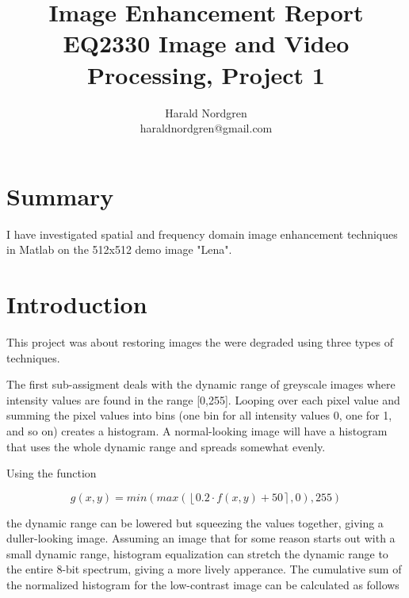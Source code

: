 \documentclass[a4paper]{article}
\begin{document}
\title{Image Enhancement Report\\
\large{EQ2330 Image and Video Processing, Project 1}}
\author{Harald Nordgren\\ haraldnordgren@gmail.com}

\maketitle

\section*{Summary}
\label{sec:summary}

I have investigated spatial and frequency domain image enhancement techniques in Matlab on the 512x512 demo image "Lena".


\section{Introduction}
\label{sec:introduction}

This project was about restoring images the were degraded using three types of techniques.

The first sub-assigment deals with the dynamic range of greyscale images where intensity values are found in the range [0,255]. Looping over each pixel value and summing the pixel values into bins (one bin for all intensity values 0, one for 1, and so on) creates a histogram. A normal-looking image will have a histogram that uses the whole dynamic range and spreads somewhat evenly.

Using the function

\begin{equation}
	\label{dr}
	g(x, y) = min(max(\left\lfloor 0.2 \cdot  f (x, y) + 50 \right \rceil, 0), 255)
\end{equation}

the dynamic range can be lowered but squeezing the values together, giving a duller-looking image. Assuming an image that for some reason starts out with a small dynamic range, histogram equalization can stretch the dynamic range to the entire 8-bit spectrum, giving a more lively apperance. The cumulative sum of the normalized histogram for the low-contrast image can be calculated as follows
\end{document}
